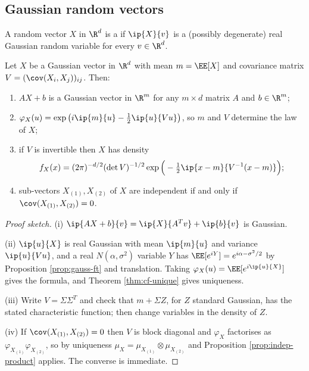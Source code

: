 \subsection{Gaussian random vectors}

\begin{definition}
	A random vector $X$ in $\R^d$ is a  if $\ip{X}{v}$ is a (possibly degenerate) real Gaussian random variable for every $v \in \R^d$.
\end{definition}

\begin{proposition}\label{prop:gaussian-vec}
	Let $X$ be a Gaussian vector in $\R^d$ with mean $m = \EE[X]$ and covariance matrix $V = (\cov(X_i,X_j))_{ij}$. Then:
	\begin{enumerate}[label=(\roman*)]
		\item $AX+b$ is a Gaussian vector in $\R^m$ for any $m\times d$ matrix $A$ and $b\in\R^m$;
		\item $\varphi_X(u)=\exp\big(i\ip{m}{u}-\tfrac12\ip{u}{Vu}\big)$, so $m$ and $V$ determine the law of $X$;
		\item if $V$ is invertible then $X$ has density
		$$
		f_X(x) = (2\pi)^{-d/2}(\det V)^{-1/2}\exp\Big(-\tfrac12\ip{x-m}{V^{-1}(x-m)}\Big);
		$$
		\item sub-vectors $X_{(1)}, X_{(2)}$ of $X$ are independent if and only if $\cov(X_{(1)},X_{(2)})=0$.
	\end{enumerate}
\end{proposition}
\begin{proof}[Proof sketch]
	(i) $\ip{AX+b}{v}=\ip{X}{A^Tv}+\ip{b}{v}$ is Gaussian.

	(ii) $\ip{u}{X}$ is real Gaussian with mean $\ip{m}{u}$ and variance $\ip{u}{Vu}$, and a real $N(\alpha,\sigma^2)$ variable $Y$ has $\EE[e^{iY}]=e^{i\alpha - \sigma^2/2}$ by Proposition \ref{prop:gauss-ft} and translation. Taking $\varphi_X(u)=\EE[e^{i\ip{u}{X}}]$ gives the formula, and Theorem \ref{thm:cf-unique} gives uniqueness.

	(iii) Write $V = \Sigma\Sigma^T$ and check that $m + \Sigma Z$, for $Z$ standard Gaussian, has the stated characteristic function; then change variables in the density of $Z$.

	(iv) If $\cov(X_{(1)},X_{(2)})=0$ then $V$ is block diagonal and $\varphi_X$ factorises as $\varphi_{X_{(1)}}\varphi_{X_{(2)}}$, so by uniqueness $\mu_X = \mu_{X_{(1)}}\otimes\mu_{X_{(2)}}$ and Proposition \ref{prop:indep-product} applies. The converse is immediate.
\end{proof}

